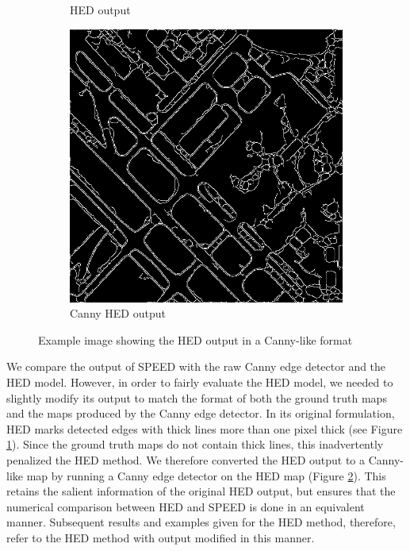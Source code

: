 \documentclass[conference]{IEEEtran}
\begin{document}
\begin{figure}
\begin{subfigure}[b]{0.48\linewidth}
        \caption{HED output \label{subfig:hed_output}}
    \end{subfigure}
    \begin{subfigure}[b]{0.48\linewidth}
        \centerline{\includegraphics[width=\linewidth]{CANNYHED.jpg}}
        \caption{Canny HED output \label{subfig:hed_canny_output}}
    \end{subfigure}
\caption{Example image showing the HED output in a Canny-like format}
\label{fig:hed_to_canny}
\end{figure}

We compare the output of SPEED with the raw Canny edge detector and the HED \cite{XieTu2015} model. However, in order to fairly evaluate the HED model, we needed to slightly modify its output to match the format of both the ground truth maps and the maps produced by the Canny edge detector. In its original formulation, HED marks detected edges with thick lines more than one pixel thick (see Figure \ref{subfig:hed_output}). Since the ground truth maps do not contain thick lines, this inadvertently penalized the HED method. We therefore converted the HED output to a Canny-like map by running a Canny edge detector on the HED map (Figure \ref{subfig:hed_canny_output}). This retains the salient information of the original HED output, but ensures that the numerical comparison between HED and SPEED is done in an equivalent manner. Subsequent results and examples given for the HED method, therefore, refer to the HED method with output modified in this manner.
\end{document}
